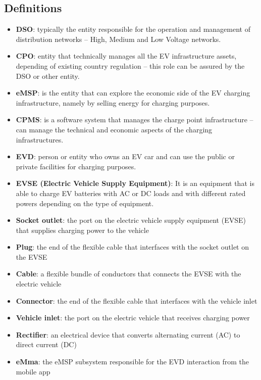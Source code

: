 \subsection{Definitions}
\begin{itemize}
    \item \textbf{DSO}: typically the entity responsible for the operation and management of distribution networks – High, Medium and Low Voltage networks.
    \item \textbf{CPO}: entity that technically manages all the EV infrastructure assets, depending of existing country regulation – this role can be assured by the DSO or other entity.
    \item \textbf{eMSP}: is the entity that can explore the economic side of the EV charging infrastructure, namely by selling energy for charging purposes.
    \item \textbf{CPMS}: is a software system that manages the charge point infrastructure – can manage the technical and economic aspects of the charging infrastructures.
    \item  \textbf{EVD}: person or entity who owns an EV car and can use the public or private facilities for charging purposes.
    \item \textbf{EVSE (Electric Vehicle Supply Equipment)}: It is an equipment that is able to charge EV batteries with AC or DC loads and with different rated powers depending on the type of equipment.
    \item \textbf{Socket outlet}: the port on the electric vehicle supply equipment (EVSE) that supplies charging power to the vehicle
    \item \textbf{Plug}: the end of the flexible cable that interfaces with the socket outlet on the EVSE
    \item \textbf{Cable}: a flexible bundle of conductors that connects the EVSE with the electric vehicle
    \item \textbf{Connector}: the end of the flexible cable that interfaces with the vehicle inlet
    \item \textbf{Vehicle inlet}: the port on the electric vehicle that receives charging power
    \item \textbf{Rectifier}: an electrical device that converts alternating current (AC) to direct current (DC)
    \item \textbf{eMma}: the eMSP subsystem responsible for the EVD interaction from the mobile app

\end{itemize}
